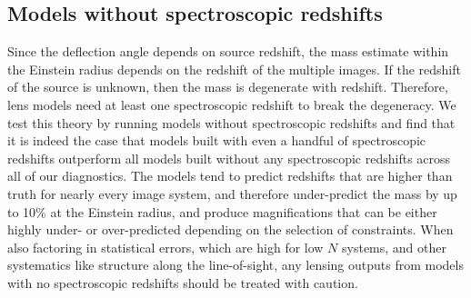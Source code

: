 \subsection{Models without spectroscopic redshifts}
Since the deflection angle depends on source redshift, the mass estimate within the Einstein radius depends on the redshift of the multiple images. If the redshift of the source is unknown, then the mass is degenerate with redshift. Therefore, lens models need at least one spectroscopic redshift to break the degeneracy. We test this theory by running models without spectroscopic redshifts and find that it is indeed the case that models built with even a handful of spectroscopic redshifts outperform all models built without any spectroscopic redshifts across all of our diagnostics. The models tend to predict redshifts that are higher than truth for nearly every image system, and therefore under-predict the mass by up to 10\% at the Einstein radius, and produce magnifications that can be either highly under- or over-predicted depending on the selection of constraints. When also factoring in statistical errors, which are high for low $N$ systems, and other systematics like structure along the line-of-sight, any lensing outputs from models with no spectroscopic redshifts should be treated with caution.

